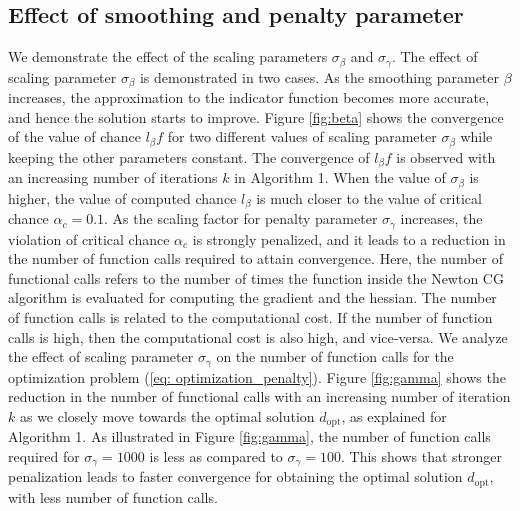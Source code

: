 \documentclass[pdf-a,balance,colorlinks,upint,subscriptcorrection,varvw,mathalfa=cal=boondoxo, spanish,french,vietnamese,russian,greek]{asmeconf}
\begin{document}
\subsection{Effect of smoothing  and penalty parameter}
We demonstrate the effect of the scaling parameters $\sigma_{\beta}$ and $\sigma_{\gamma}$. The effect of scaling parameter $\sigma_{\beta}$ is demonstrated in two cases. As the smoothing parameter $\beta$ increases, the approximation to the indicator function becomes more accurate, and hence the solution starts to improve. Figure \ref{fig:beta} shows the convergence of the value of chance $l_{\beta} f$ for two different values of scaling parameter $\sigma_{\beta}$ while keeping the other parameters constant. The convergence of $l_{\beta} f$ is observed with an increasing number of iterations $k$ in Algorithm 1. When the value of $\sigma_{\beta}$ is higher, the value of computed chance $l_{\beta}$ is much closer to the value of critical chance $\alpha_{c} = 0.1$. 
As the scaling factor for penalty parameter $\sigma_{\gamma}$ increases, the violation of critical chance $\alpha_{c}$ is strongly penalized, and it leads to a reduction in the number of function calls required to attain convergence. Here, the number of functional calls refers to the number of times the function inside the Newton CG algorithm is evaluated for computing the gradient and the hessian. The number of function calls is related to the computational cost. If the number of function calls is high, then the computational cost is also high, and vice-versa. We analyze the effect of scaling parameter $\sigma_{\gamma}$ on the number of function calls for the optimization problem (\ref{eq: optimization_penalty}). Figure \ref{fig:gamma} shows the reduction in the number of functional calls with an increasing number of iteration $k$ as we closely move towards the optimal solution $d_{\text{opt}}$, as explained for Algorithm 1. As illustrated in Figure \ref{fig:gamma}, the number of function calls required for $\sigma_{\gamma}=1000$ is less as compared to $\sigma_{\gamma}=100$. This shows that stronger penalization leads to faster convergence for obtaining the optimal solution $d_{\text{opt}}$, with less number of function calls.
\end{document}
